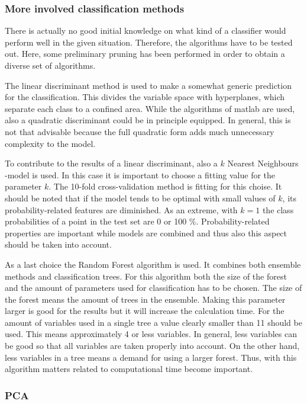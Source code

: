 \documentclass[twoside]{article}
\begin{document}
\begin{multicols}{2}
\subsubsection{More involved classification methods}

There is actually no good initial knowledge on what kind of a classifier
would perform well in the given situation. Therefore, the algorithms have to be tested out. Here, some preliminary 
pruning has been performed in order to obtain a diverse set of algorithms.

The linear discriminant method is used to make a somewhat generic prediction for the classification. This divides the variable space
with hyperplanes, which separate each class to a confined area. While the algorithms of matlab are used, also a quadratic discriminant
could be in principle equipped. In general, this is not that advisable because the full quadratic form adds much unnecessary complexity
to the model.

To contribute to the results of a linear discriminant, also a $k$ Nearest Neighbours -model is used. In this case it is important to choose
a fitting value for the parameter $k$. The 10-fold cross-validation method is fitting for this choise. It should be noted that if the model
tends to be optimal with small values of $k$, its probability-related features are diminished. As an extreme, with $k=1$ the class probabilities
of a point in the test set are 0 or 100 $\%$. Probability-related properties are important while models are combined and thus also this aspect
should be taken into account.

As a last choice the Random Forest algorithm is used. It combines both ensemble methods and classification trees. For this algorithm both the size
of the forest and the amount of parameters used for classification has to be chosen. The size of the forest means the amount of trees in the ensemble.
Making this parameter larger is good for the results but it will increase the calculation time. For the amount of variables used in a single tree a
value clearly smaller than 11 should be used. This means approximately 4 or less variables. In general, less variables can be good so that
all variables are taken properly into account. On the other hand, less variables in a tree means a demand for using a larger forest. Thus,
with this algorithm matters related to computational time become important.

\subsubsection{PCA}


\end{multicols}
\end{document}
